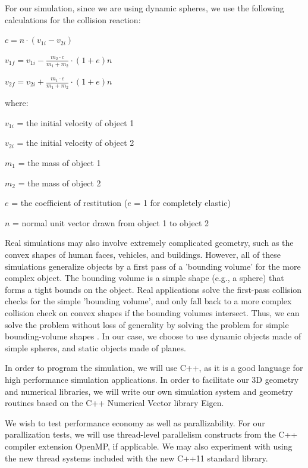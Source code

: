 \documentclass[conference]{IEEEtran}
\begin{document}
For our simulation, since we are using dynamic spheres, we use the following calculations for the collision reaction\cite{wheatchex}:

\begin{math}
c = n \cdot (v_{1i} - v_{2i})
\end{math}

\begin{math}
v_{1f} = v_{1i} - \frac{m_2 \cdot c}{m_1 + m_2} \cdot (1 + e)n
\end{math}

\begin{math}
v_{2f} = v_{2i} + \frac{m_1 \cdot c}{m_1 + m_2} \cdot (1 + e)n
\end{math}

where:

$v_{1i}$ = the initial velocity of object 1

$v_{2i}$ = the initial velocity of object 2

$m_1$ = the mass of object 1

$m_2$ = the mass of object 2

$e$ = the coefficient of restitution ($e$ = 1 for completely elastic)

$n$ = normal unit vector drawn from object 1 to object 2


Real simulations may also involve extremely complicated geometry, such as the convex shapes of human faces, vehicles, and buildings.  However, 
all of these simulations generalize objects by a first pass of a 'bounding volume' for the more complex object.  The bounding volume is a simple shape (e.g., a sphere)
that forms a tight bounds on the object.  Real applications solve the first-pass collision checks for the simple 'bounding volume', and only fall back to a more complex
collision check on convex shapes if the bounding volumes intersect.  Thus, we can solve the problem without loss of generality by solving the problem
for simple bounding-volume shapes \cite{uberflow,cloth}.  In our case, we choose to use dynamic objects made of simple spheres, and static objects made of planes.

In order to program the simulation, we will use C++, as it is a good language for high performance simulation applications.  In order to facilitate our 
3D geometry and numerical libraries, we will write our own simulation system and geometry routines based on the C++ Numerical Vector library Eigen.  

We wish to test performance economy as well as parallizability.  For our parallization tests, we will use thread-level parallelism constructs from the C++ compiler
extension OpenMP, if applicable.  We may also experiment with using the new thread systems included with the new C++11 standard library.
\end{document}
